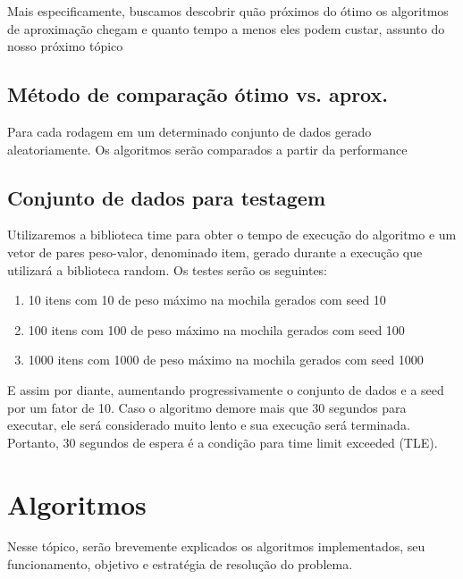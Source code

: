 \documentclass{article}
\begin{document}
            Mais especificamente, buscamos descobrir quão próximos do ótimo os algoritmos de aproximação chegam e quanto tempo a menos eles podem custar, assunto do nosso próximo tópico
    
    \subsection{Método de comparação ótimo vs. aprox.}
        Para cada rodagem em um determinado conjunto de dados gerado aleatoriamente. Os algoritmos
        serão comparados a partir da performance 
    \subsection{Conjunto de dados para testagem}
    Utilizaremos a biblioteca time para obter o tempo de execução do algoritmo e um vetor de pares peso-valor, denominado item, gerado durante a execução que utilizará a biblioteca random. Os testes serão os seguintes:
        \begin{enumerate}
            \item 10 itens com 10 de peso máximo na mochila gerados com seed 10
            \item 100 itens com 100 de peso máximo na mochila gerados com seed 100
            \item 1000 itens com 1000 de peso máximo na mochila gerados com seed 1000
        \end{enumerate}
    E assim por diante, aumentando progressivamente o conjunto de dados e a seed por um fator de 10. Caso o algoritmo demore mais que 30 segundos para executar, ele será considerado muito lento e sua execução será terminada. Portanto, 30 segundos de espera é a condição para time limit exceeded (TLE).
    
    \section{Algoritmos}\label{algoritmos}
    Nesse tópico, serão brevemente explicados os algoritmos implementados, seu funcionamento, objetivo e estratégia de resolução do problema.
    
\end{document}
